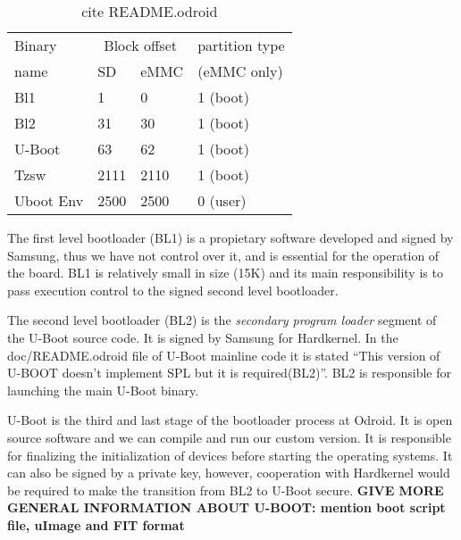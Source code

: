 \begin{table}[h]
\begin{center}
 \begin{tabular}{| l | l | l | l |}
 \hline
 Binary & \multicolumn{2}{|c|}{Block offset} & partition type \\
 name   & SD & eMMC & (eMMC only) \\
 \hline
 \hline
 Bl1 & 1 & 0 & 1 (boot) \\
 \hline
 Bl2 & 31 & 30 & 1 (boot) \\
 \hline
 U-Boot & 63 & 62 & 1 (boot) \\
 \hline
 Tzsw & 2111 & 2110 & 1 (boot) \\
 \hline
 Uboot Env & 2500 & 2500 & 0 (user) \\
 \hline
 \end{tabular}
\caption{cite README.odroid}
\label{tab:odroid-boot-placement}
\end{center}
\end{table}



The first level bootloader (BL1) is a propietary software developed and signed by Samsung, thus we have not control over it, and is essential for the operation of the board. BL1 is relatively small in size (15K)  and its main responsibility is to pass execution control to the signed second level bootloader.

The second level bootloader (BL2) is the \textit{secondary program loader} segment of the U-Boot source code. It is signed by Samsung for Hardkernel. In the doc/README.odroid file of U-Boot mainline code it is stated ``This version of U-BOOT doesn't implement SPL but it is required(BL2)''. BL2 is responsible for launching the main U-Boot binary.

U-Boot is the third and last stage of the bootloader process at Odroid. It is open source software and we can compile and run our custom version. It is responsible for finalizing the initialization of devices before starting the operating systems. It can also be signed by a private key, however, cooperation with Hardkernel would be required to make the transition from BL2 to U-Boot secure. \textbf{GIVE MORE GENERAL INFORMATION ABOUT U-BOOT: mention boot script file, uImage and FIT format}

